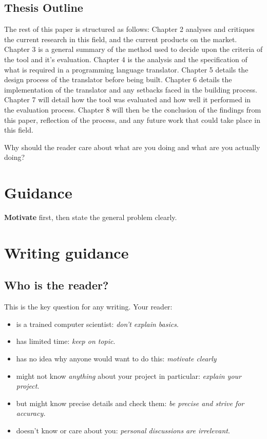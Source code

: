 \documentclass{l4proj}
\begin{document}
\subsection{Thesis Outline}
The rest of this paper is structured as follows:
Chapter 2 analyses and critiques the current research in this field, and the current products on the market.
Chapter 3 is a general summary of the method used to decide upon the criteria of the tool and it's evaluation.
Chapter 4 is the analysis and the specification of what is required in a programming language translator.
Chapter 5 details the design process of the translator before being built.
Chapter 6 details the implementation of the translator and any setbacks faced in the building process.
Chapter 7 will detail how the tool was evaluated and how well it performed in the evaluation process.
Chapter 8 will then be the conclusion of the findings from this paper, reflection of the process,  and any future work that could take place in this field.








Why should the reader care about what are you doing and what are you actually doing?
\section{Guidance}

\textbf{Motivate} first, then state the general problem clearly. 

\section{Writing guidance}
\subsection{Who is the reader?}

This is the key question for any writing. Your reader:

\begin{itemize}
    \item
    is a trained computer scientist: \emph{don't explain basics}.
    \item
    has limited time: \emph{keep on topic}.
    \item
    has no idea why anyone would want to do this: \emph{motivate clearly}
    \item
    might not know \emph{anything} about your project in particular:
    \emph{explain your project}.
    \item
    but might know precise details and check them: \emph{be precise and
    strive for accuracy.}
    \item
    doesn't know or care about you: \emph{personal discussions are
    irrelevant}.
\end{itemize}
\end{document}
